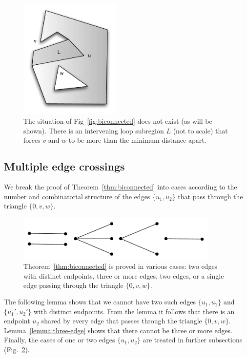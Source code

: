 \documentclass[11pt]{amsart}
\begin{document}
\begin{figure}
\begin{center}
\includegraphics[width=5cm]{biconnectedloop}
\end{center}
\caption{The situation of Fig~\ref{fig:biconnected} does not exist
(as will be shown).  There is an intervening loop subregion $L$ (not to scale) that forces
$v$ and $w$ to be more than the minimum distance apart.}
\label{fig:biconnectedloop}
\end{figure}


\subsection*{Multiple edge crossings}

We break the proof of Theorem~\ref{thm:biconnected} into cases according
to the number and combinatorial structure of the edges $\{u_1,u_2\}$
that pass through the triangle $\{0,v,w\}$.

\begin{figure}
\begin{center}
\includegraphics[width=10cm]{cases}
\end{center}
\caption{Theorem~\ref{thm:biconnected} is proved in various cases: two edges with
distinct endpoints, three or more edges, two edges, or a single edge
passing through the triangle $\{0,v,w\}$.}
\label{fig:cases}
\end{figure}

The following lemma shows that we cannot have two such edges $\{u_1,u_2\}$ and $\{u_1',u_2'\}$ with distinct endpoints.  From the lemma it follows that there is an endpoint $u_2$ shared by every edge that passes through the
triangle $\{0,v,w\}$.  Lemma~\ref{lemma:three-edge} shows that there cannot be three or more edges.  Finally, the cases of one or two edges $\{u_1,u_2\}$ are treated in further subsections (Fig.~\ref{fig:cases}).
\end{document}
